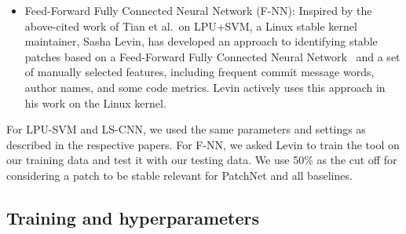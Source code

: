 \begin{itemize}[leftmargin=0.4cm]

\item Feed-Forward Fully Connected Neural Network (F-NN): Inspired by the
  above-cited work of Tian et al.\ on LPU+SVM, a Linux stable kernel
  maintainer, Sasha Levin, has developed an approach to identifying
  stable patches \cite{sasha} based on a Feed-Forward Fully
  Connected Neural Network~\cite{bishop1995neural, goodfellow2016deep} and
  a set of manually selected features, including frequent commit message
  words, author names, and some code metrics.  Levin actively uses this
  approach in his work on the Linux kernel.
\end{itemize}

For LPU-SVM and LS-CNN, we used the same parameters and settings as
described in the respective papers. For F-NN, we asked Levin to train the tool on our training data and
test it with our testing data. We use 50\% as the cut off for considering a patch to be stable relevant for PatchNet and all baselines.

\subsection{Training and hyperparameters}
\label{sec:parameters}



